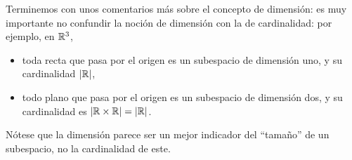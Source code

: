 Terminemos con unos comentarios más sobre el concepto de dimensión:
es muy importante no confundir la noción de dimensión con
la de cardinalidad: por ejemplo, en $\mathbb{R}^{3}$, 
\begin{itemize}
	\item toda recta que pasa por el origen es un subespacio
	de dimensión uno, y su cardinalidad $|\mathbb{R}|$, 
	\item todo plano que pasa por el origen es un subespacio
	de dimensión dos, y su cardinalidad es $|\mathbb{R} \times \mathbb{R}| = |\mathbb{R}|$.
\end{itemize}
Nótese que la dimensión parece ser un mejor indicador del
``tamaño'' de un subespacio, no la cardinalidad de este. 
\newpage









































